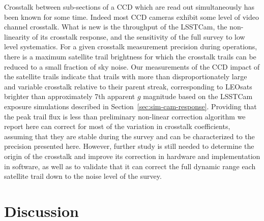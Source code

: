 \documentclass[twocolumn,trackchanges]{aastex63}
\begin{document}
Crosstalk between sub-sections of a CCD which are read out simultaneously has been known for some time.  Indeed most CCD cameras exhibit some level of video channel crosstalk. What is new is the throughput of the LSSTCam, the non-linearity of its crosstalk response, and the sensitivity of the full survey to low level systematics. For a given crosstalk measurement precision during operations, there is a maximum satellite trail brightness for which the crosstalk trails can be reduced to a small fraction of sky noise. Our measurements of the CCD impact of the satellite trails indicate that trails with more than  disproportionately large and variable crosstalk relative to their parent streak, corresponding to LEOsats brighter than approximately 7th apparent $g$ magnitude based on the LSSTCam exposure simulations described in Section~\ref{sec:sim-cam-response}.
Providing that the peak trail flux is less than  preliminary non-linear correction algorithm we report here can correct for most of the variation in crosstalk coefficients, assuming that they are stable during the survey and can be characterized to the precision presented here. However, further study is still needed to determine the origin of the crosstalk and improve its correction in hardware and implementation in software, as well as to validate that it can correct the full dynamic range each satellite trail down to  the noise level of the survey.



\section{Discussion}
\label{sec:discuss}
\end{document}
